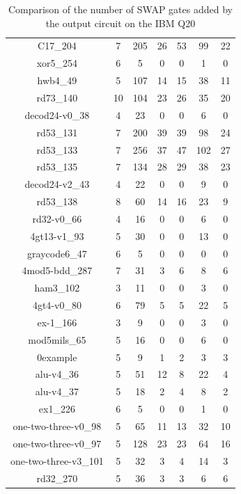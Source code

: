 \documentclass[runningheads]{llncs}
\begin{document}
\begin{table}[H]
\begin{center}
\begin{tabular}{|c|c|c|c|c|c|c|}
C17\_204 & 7 & 205 & 26 & 53 & 99 & 22 \\ 
xor5\_254 & 6 & 5 & 0 & 0 & 1 & 0 \\ 
hwb4\_49 & 5 & 107 & 14 & 15 & 38 & 11 \\ 
rd73\_140 & 10 & 104 & 23 & 26 & 35 & 20 \\ 
decod24-v0\_38 & 4 & 23 & 0 & 0 & 6 & 0 \\ 
rd53\_131 & 7 & 200 & 39 & 39 & 98 & 24 \\ 
rd53\_133 & 7 & 256 & 37 & 47 & 102 & 27 \\ 
rd53\_135 & 7 & 134 & 28 & 29 & 38 & 23 \\ 
decod24-v2\_43 & 4 & 22 & 0 & 0 & 9 & 0 \\ 
rd53\_138 & 8 & 60 & 14 & 16 & 23 & 9 \\ 
rd32-v0\_66 & 4 & 16 & 0 & 0 & 6 & 0 \\ 
4gt13-v1\_93 & 5 & 30 & 0 & 0 & 13 & 0 \\ 
graycode6\_47 & 6 & 5 & 0 & 0 & 0 & 0 \\ 
4mod5-bdd\_287 & 7 & 31 & 3 & 6 & 8 & 6 \\ 
ham3\_102 & 3 & 11 & 0 & 0 & 3 & 0 \\ 
4gt4-v0\_80 & 6 & 79 & 5 & 5 & 22 & 5 \\ 
ex-1\_166 & 3 & 9 & 0 & 0 & 3 & 0 \\ 
mod5mils\_65 & 5 & 16 & 0 & 0 & 6 & 0 \\ 
0example & 5 & 9 & 1 & 2 & 3 & 3 \\ 
alu-v4\_36 & 5 & 51 & 12 & 8 & 22 & 4 \\ 
alu-v4\_37 & 5 & 18 & 2 & 4 & 8 & 2 \\ 
ex1\_226 & 6 & 5 & 0 & 0 & 1 & 0 \\ 
one-two-three-v0\_98 & 5 & 65 & 11 & 13 & 32 & 10 \\ 
one-two-three-v0\_97 & 5 & 128 & 23 & 23 & 64 & 16 \\ 
one-two-three-v3\_101 & 5 & 32 & 3 & 4 & 14 & 3 \\ 
rd32\_270 & 5 & 36 & 3 & 3 & 6 & 6 \\
\hline
	\end{tabular} 
	\end{center}
	\caption{Comparison of  the number of  SWAP gates added by the 
	output circuit on the IBM Q20 } 
	\label{tab2}
	\end{table}
\end{document}
